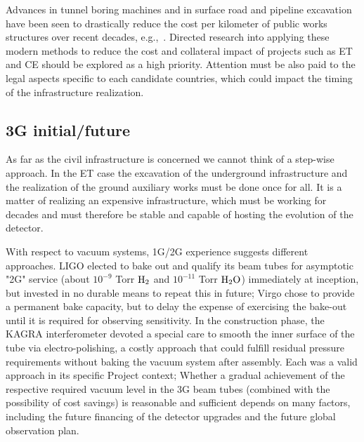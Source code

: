 Advances in tunnel boring machines and in surface road and pipeline excavation have been seen to drastically reduce the cost per kilometer of public works structures over recent decades, e.g.,~\cite{BoringCompany}. Directed research into applying these modern methods to reduce the cost and collateral impact of projects such as ET and CE should be explored as a high priority. 
Attention must be also paid to the legal aspects specific to each candidate countries, which could impact the timing of the infrastructure realization. 

\subsection{3G initial/future}

As far as the civil infrastructure is concerned we cannot think of a step-wise approach. In the ET case the excavation of the underground infrastructure and the realization of the ground auxiliary works must be done once for all. It is a matter of realizing an expensive infrastructure, which must be working for decades and must therefore be stable  and capable of hosting the evolution of the detector.

With respect to vacuum systems, 1G/2G experience suggests different approaches. LIGO elected to bake out and qualify its beam tubes for asymptotic "2G" service (about $10^{-9}$ Torr $\rm H_2$ and $10^{-11} $ Torr $\rm H_2O$) immediately at inception, but invested in no durable means to repeat this in future; Virgo chose to provide a permanent bake capacity, but to delay the expense of exercising the bake-out until it is required for observing sensitivity. In the construction phase, the  KAGRA interferometer devoted  a special care to smooth the inner surface of the tube via electro-polishing, a costly approach that could fulfill  residual pressure requirements without baking the vacuum system  after assembly.  Each was a valid approach in its specific Project context; Whether a gradual achievement of the respective required vacuum level in the 3G beam tubes (combined with the possibility of cost savings) is reasonable and sufficient depends on many factors, including the future financing of the detector upgrades and the future global observation plan.  


